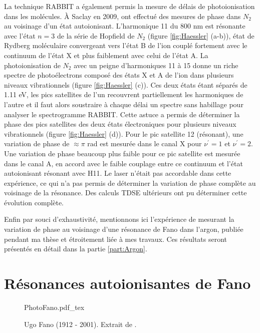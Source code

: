 La technique RABBIT a également permis la mesure de délais de photoionisation dans les molécules. \`A Saclay en 2009,  ont effectué des mesures de phase dans $N_2$ au voisinage d'un état autoionisant. L'harmonique 11 du 800 nm est résonante avec l'état $n=3$ de la série de Hopfield de $N_2$ (figure \ref{fig:Haessler} (a-b)), état de Rydberg moléculaire convergeant vers l'état B de l'ion couplé fortement avec le continuum de l'état X et plus faiblement avec celui de l'état A. La photoionisation de $N_2$ avec un peigne d'harmoniques 11 à 15 donne un riche spectre de photoélectrons composé des états X et A de l'ion dans plusieurs niveaux vibrationnels (figure \ref{fig:Haessler} (c)). Ces deux états étant séparés de 1.11 eV, les pics satellites de l'un recouvrent partiellement les harmoniques de l'autre et il faut alors soustraire à chaque délai un spectre sans habillage pour analyser le spectrogramme RABBIT. Cette astuce a permis de déterminer la phase des pics satellites des deux états électroniques pour plusieurs niveaux vibrationnels (figure \ref{fig:Haessler} (d)). Pour le pic satellite 12 (résonant), une variation de phase de $\approx \pi$ rad est mesurée dans le canal X pour $\nu^{'} = 1$ et $\nu^{'} = 2$. Une variation de phase beaucoup plus faible pour ce pic satellite est mesurée dans le canal A, en accord avec le faible couplage entre ce continuum et l'état autoionisant résonant avec H11. Le laser n'était pas accordable dans cette expérience, ce qui n'a pas permis de déterminer la variation de phase complète au voisinage de la résonance. Des calculs TDSE ultérieurs  ont pu déterminer cette évolution complète.

Enfin par souci d'exhaustivité, mentionnons ici l'expérience de  mesurant la variation de phase au voisinage d'une résonance de Fano dans l'argon, publiée pendant ma thèse et étroitement liée à mes travaux. Ces résultats seront présentés en détail dans la partie \ref{part:Argon}.

\chapter{Résonances autoionisantes de Fano}
\label{chap:ResonancesFano}
\begin{figure}[h]
\centering
\def\svgwidth{0.3\textwidth}
{PhotoFano.pdf_tex}
\caption{Ugo Fano (1912 - 2001). Extrait de .}
\label{fig:PhotoFano}
\end{figure}

